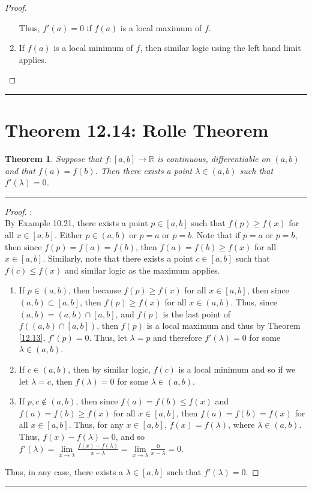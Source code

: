 \documentclass[openany, amssymb, psamsfonts]{amsart}
\newcommand{\bbR}{\mathbb{R}}
\newtheorem{thm}{Theorem}[section]
\theoremstyle{definition}
\numberwithin{equation}{section}
\begin{document}
\begin{proof}
\begin{enumerate}
\begin{enumerate}
    \end{enumerate}
    Thus, $f'(a) = 0$ if $f(a)$ is a local maximum of $f$.
    \item If $f(a)$ is a local minimum of $f$, then similar logic using the left hand limit applies. 
    \end{enumerate}
\end{proof}\vspace{4pt}     \hrule   \vspace{4pt}

\section*{Theorem 12.14: Rolle Theorem}
\begin{thm}\label{12.14}
	Suppose that $f\colon [a, b] \to \bbR$ is continuous, differentiable on $(a, b)$ and that $f(a) = f(b)$. Then there exists a point $\lambda \in (a, b)$ such that $f'(\lambda) = 0$.
\end{thm}
\vspace{4pt}     \hrule   \vspace{4pt} \begin{proof}:\\
By Example 10.21, there exists a point $p \in [a,b]$ such that $f(p)\geq f(x)$ for all $x\in [a,b]$. Either $p \in (a,b)$ or $p = a$ or $p = b$. Note that if $p=a$ or $p=b$, then since $f(p) = f(a) = f(b)$, then $f(a) = f(b) \geq f(x)$ for all $x\in [a,b]$. Similarly, note that there exists a point $c\in [a,b]$ such that $f(c)\leq f(x)$ and similar logic as the maximum applies.
\begin{enumerate}
    \item If $p \in (a,b)$, then because $f(p) \geq f(x)$ for all $x\in [a,b]$, then since $(a,b)\subset [a,b]$, then $f(p) \geq f(x)$ for all $x\in (a,b)$. Thus, since $(a,b) = (a,b) \cap [a,b]$, and $f(p)$ is the last point of $f((a,b) \cap [a,b])$, then $f(p)$ is a local maximum and thus by Theorem \ref{12.13}, $f'(p) = 0$. Thus, let $\lambda = p$ and therefore $f'(\lambda) = 0$ for some $\lambda \in (a,b)$.
    \item If $c \in (a,b)$, then by similar logic, $f(c)$ is a local minimum and so if we let $\lambda = c$, then $f
    (\lambda) = 0$ for some $\lambda \in (a,b)$.
    \item If $p,c \notin (a,b)$, then since $f(a) = f(b)\leq f(x)$ and $f(a) = f(b) \geq f(x)$ for all $x\in [a,b]$, then $f(a) = f(b) = f(x)$ for all $x\in [a,b]$. Thus, for any $x \in [a,b]$, $f(x) = f(\lambda)$, where $\lambda \in (a,b)$. Thus, $f(x) - f(\lambda) = 0$, and so $f'(\lambda) = \lim\limits_{x\to \lambda} \frac{f(x) - f(\lambda)}{x-\lambda} = \lim\limits_{x\to \lambda}\frac{0}{x-\lambda} = 0$. 
\end{enumerate}
Thus, in any case, there exists a $\lambda\in [a,b]$ such that $f'(\lambda) = 0$. 
\end{proof}\vspace{4pt}     \hrule   \vspace{4pt}
\end{document}
